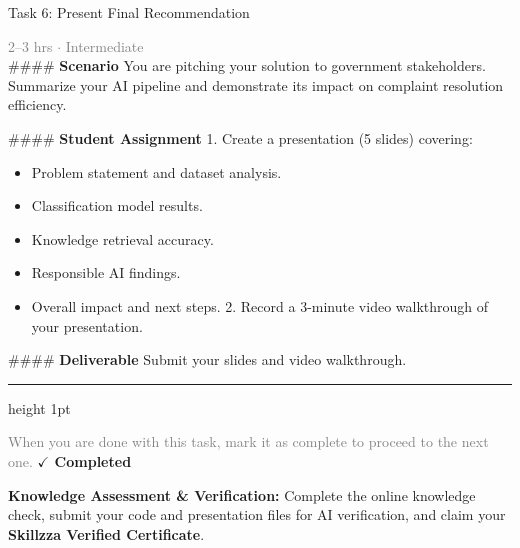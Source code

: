 \documentclass[10pt,a4paper]{article}
\begin{document}
\begin{taskbox}{Task 6: Present Final Recommendation}

    {\small \textcolor{gray}{2--3 hrs $\cdot$ Intermediate}}\\[12pt]

    \#\#\#\# \textbf{Scenario}  
You are pitching your solution to government stakeholders. Summarize your AI pipeline and demonstrate its impact on complaint resolution efficiency.  

\#\#\#\# \textbf{Student Assignment}  
1. Create a presentation (5 slides) covering:  
\begin{itemize}
    \item Problem statement and dataset analysis.  
    \item Classification model results.  
    \item Knowledge retrieval accuracy.  
    \item Responsible AI findings.  
    \item Overall impact and next steps.  
2. Record a 3-minute video walkthrough of your presentation.  
\end{itemize}

\#\#\#\# \textbf{Deliverable}  
Submit your slides and video walkthrough.\par

    \vspace{16pt}

    \textcolor{cardBorder}{\hrule height 1pt}\vspace{8pt}

    \small \textcolor{gray}{When you are done with this task, mark it as complete to proceed to the next one.} \hfill \textbf{\textcolor{brandDark}{$\checkmark$ Completed}}

\end{taskbox}

\begin{completionbox}
    \textbf{Knowledge Assessment \& Verification:} Complete the online knowledge check, submit your code and presentation files for AI verification, and claim your \textbf{Skillzza Verified Certificate}.
\end{completionbox}

\newpage



\end{document}
